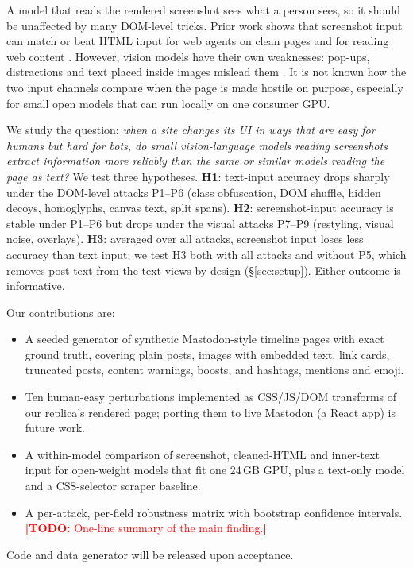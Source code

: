 \documentclass[letterpaper,10pt,twocolumn]{article}
\newcommand{\todo}[1]{\textcolor{red}{\textbf{[TODO:} #1\textbf{]}}}
\begin{document}
A model that reads the rendered screenshot sees what a person sees, so it
should be unaffected by many DOM-level tricks. Prior work shows that screenshot
input can match or beat HTML input for web agents on clean pages
\citep{zheng2024seeact,he2024webvoyager,hong2023cogagent} and for reading web
content \citep{wang2026pixelrag}. However, vision models have their own
weaknesses: pop-ups, distractions and text placed inside images mislead them
\citep{zhang2024popups,ma2024caution,cheng2024typographic}. It is not known how
the two input channels compare when the page is made hostile on purpose,
especially for small open models that can run locally on one consumer GPU.

We study the question: \emph{when a site changes its UI in ways that are easy
for humans but hard for bots, do small vision-language models reading
screenshots extract information more reliably than the same or similar models
reading the page as text?} We test three hypotheses. \textbf{H1}: text-input
accuracy drops sharply under the DOM-level attacks P1--P6 (class obfuscation,
DOM shuffle, hidden decoys, homoglyphs, canvas text, split spans).
\textbf{H2}: screenshot-input accuracy is stable under P1--P6 but drops under
the visual attacks P7--P9 (restyling, visual noise, overlays). \textbf{H3}:
averaged over all attacks, screenshot input loses less accuracy than text
input; we test H3 both with all attacks and without P5, which removes post
text from the text views by design (\S\ref{sec:setup}). Either outcome is
informative.

Our contributions are:
\begin{itemize}\itemsep0pt
  \item A seeded generator of synthetic Mastodon-style timeline pages with exact
        ground truth, covering plain posts, images with embedded text, link
        cards, truncated posts, content warnings, boosts, and hashtags,
        mentions and emoji.
  \item Ten human-easy perturbations implemented as CSS/JS/DOM transforms of
        our replica's rendered page; porting them to live Mastodon (a React
        app) is future work.
  \item A within-model comparison of screenshot, cleaned-HTML and inner-text
        input for open-weight models that fit one 24\,GB GPU, plus a
        text-only model and a CSS-selector scraper baseline.
  \item A per-attack, per-field robustness matrix with bootstrap confidence
        intervals. \todo{One-line summary of the main finding.}
\end{itemize}
Code and data generator will be released upon acceptance.
\end{document}
